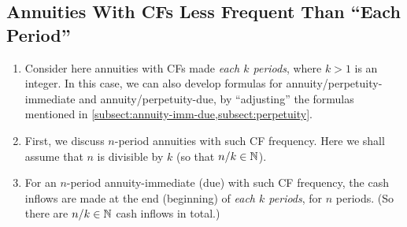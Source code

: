 \subsection{Annuities With CFs Less Frequent Than ``Each Period''}
\label{subsect:annuities-less-freq}
\begin{enumerate}
\item Consider here annuities with CFs made \emph{each \(k\) periods}, where
\(k>1\) is an integer. In this case, we can also develop formulas for
annuity/perpetuity-immediate and annuity/perpetuity-due, by ``adjusting'' the
formulas mentioned in \cref{subsect:annuity-imm-due,subsect:perpetuity}.
\item First, we discuss \(n\)-period annuities with such CF frequency. Here we
shall assume that \(n\) is divisible by \(k\) (so that \(n/k\in\mathbb{N}\)).
\item For an \(n\)-period annuity-immediate (due) with such CF frequency, the cash
inflows are made at the end (beginning) of \emph{each \(k\) periods}, for \(n\)
periods. (So there are \(n/k\in\mathbb{N}\) cash inflows in total.)


\end{enumerate}
